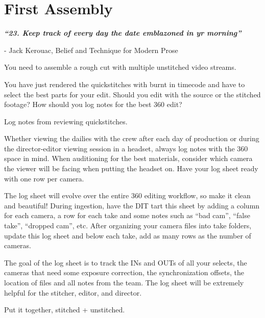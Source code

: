 \chapter{First Assembly}
\pagecolor{white}
\label{chap:31}
\begin{fullwidth}

{\itshape\bfseries “23. Keep track of every day the date emblazoned in yr morning”}

- Jack Kerouac, Belief and Technique for Modern Prose
\vspace{\baselineskip}

\problem

{\large You need to assemble a rough cut with multiple unstitched video streams. \par}

You have just rendered the quickstitches with burnt in timecode and have to select the best parts for your edit. Should you edit with the source or the stitched footage? How should you log notes for the best 360 edit?  

\solution

{\large Log notes from reviewing quickstitches. \par}

Whether viewing the dailies with the crew after each day of production or during the director-editor viewing session in a headset, always log notes with the 360 space in mind. When auditioning for the best materials, consider which camera the viewer will be facing when putting the  headset on. Have your log sheet ready with one row per camera. 


The log sheet will evolve over the entire 360 editing workflow, so make it clean and beautiful! During ingestion, have the DIT tart this sheet by adding a column for each camera, a row for each take and some notes such as “bad cam”, “false take”, “dropped cam”, etc. After organizing your camera files into take folders, update this log sheet and below each take, add as many rows as the number of cameras.


The goal of the log sheet is to track the INs and OUTs of all your selects, the cameras that need some exposure correction, the synchronization offsets, the location of files and all notes from the team. The log sheet will be extremely helpful for the stitcher, editor, and director.

{\large Put it together, stitched + unstitched. \par}


\end{fullwidth}
